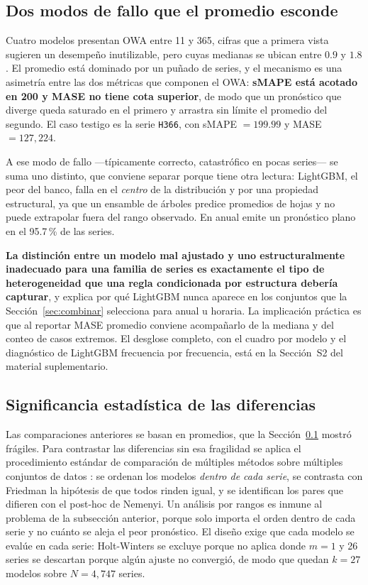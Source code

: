 \subsection{Dos modos de fallo que el promedio esconde}\label{sec:extremos}

Cuatro modelos presentan OWA entre 11 y 365, cifras que a primera vista sugieren un
desempeño inutilizable, pero cuyas medianas se ubican entre $0.9$ y $1.8$. El promedio
está dominado por un puñado de series, y el mecanismo es una asimetría entre las dos
métricas que componen el OWA: \textbf{sMAPE está acotado en 200 y MASE no tiene cota
superior}, de modo que un pronóstico que diverge queda saturado en el primero y arrastra
sin límite el promedio del segundo. El caso testigo es la serie \texttt{H366}, con sMAPE
$=199.99$ y MASE $=127{,}224$.

A ese modo de fallo ---típicamente correcto, catastrófico en pocas series--- se suma uno
distinto, que conviene separar porque tiene otra lectura: LightGBM, el peor del banco,
falla en el \emph{centro} de la distribución y por una propiedad estructural, ya que un
ensamble de árboles predice promedios de hojas y no puede extrapolar fuera del rango
observado. En anual emite un pronóstico plano en el 95.7\,\% de las series.

\textbf{La distinción entre un modelo mal ajustado y uno estructuralmente inadecuado
para una familia de series es exactamente el tipo de heterogeneidad que una regla
condicionada por estructura debería capturar}, y explica por qué LightGBM nunca aparece
en los conjuntos que la Sección~\ref{sec:combinar} selecciona para anual u horaria. La
implicación práctica es que al reportar MASE promedio conviene acompañarlo de la mediana
y del conteo de casos extremos. El desglose completo, con el cuadro por modelo y el
diagnóstico de LightGBM frecuencia por frecuencia, está en la Sección~S2 del material
suplementario.

\subsection{Significancia estadística de las diferencias}\label{sec:friedman}

Las comparaciones anteriores se basan en promedios, que la Sección~\ref{sec:extremos} mostró
frágiles. Para contrastar las diferencias sin esa fragilidad se aplica el
procedimiento estándar de comparación de múltiples métodos sobre múltiples conjuntos de
datos \cite{demsar2006}: se ordenan los modelos \emph{dentro de cada serie}, se contrasta
con Friedman la hipótesis de que todos rinden igual, y se identifican los pares que
difieren con el post-hoc de Nemenyi. Un análisis por rangos es inmune al problema de la
subsección anterior, porque solo importa el orden dentro de cada serie y no cuánto se
aleja el peor pronóstico. El diseño exige que cada modelo se evalúe en cada serie:
Holt-Winters se excluye porque no aplica donde $m=1$ y 26 series se descartan porque algún
ajuste no convergió, de modo que quedan $k=27$ modelos sobre $N=4{,}747$ series.


